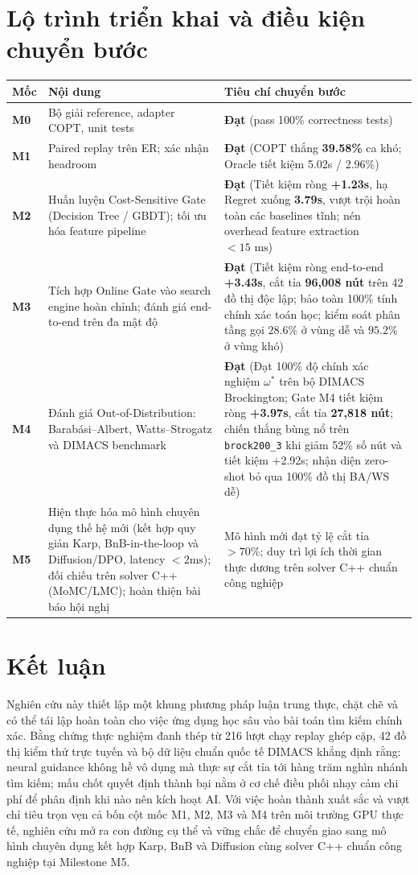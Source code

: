 \documentclass[11pt,a4paper]{article}
\begin{document}
\section{Lộ trình triển khai và điều kiện chuyển bước}
\begin{tabularx}{\linewidth}{lXX}
\toprule
Mốc & Nội dung & Tiêu chí chuyển bước\\
\midrule
\textbf{M0} & Bộ giải reference, adapter COPT, unit tests & \textbf{Đạt} (pass 100\% correctness tests)\\
\textbf{M1} & Paired replay trên ER; xác nhận headroom & \textbf{Đạt} (COPT thắng \textbf{39.58\%} ca khó; Oracle tiết kiệm 5.02s / 2.96\%)\\
\textbf{M2} & Huấn luyện Cost-Sensitive Gate (Decision Tree / GBDT); tối ưu hóa feature pipeline & \textbf{Đạt} (Tiết kiệm ròng \textbf{+1.23s}, hạ Regret xuống \textbf{3.79s}, vượt trội hoàn toàn các baselines tĩnh; nén overhead feature extraction $< 15\text{ ms}$)\\
\textbf{M3} & Tích hợp Online Gate vào search engine hoàn chỉnh; đánh giá end-to-end trên đa mật độ & \textbf{Đạt} (Tiết kiệm ròng end-to-end \textbf{+3.43s}, cắt tỉa \textbf{96,008 nút} trên 42 đồ thị độc lập; bảo toàn 100\% tính chính xác toán học; kiểm soát phân tầng gọi $28.6\%$ ở vùng dễ và $95.2\%$ ở vùng khó)\\
\textbf{M4} & Đánh giá Out-of-Distribution: Barab\'asi--Albert, Watts--Strogatz và DIMACS benchmark & \textbf{Đạt} (Đạt 100\% độ chính xác nghiệm $\omega^*$ trên bộ DIMACS Brockington; Gate M4 tiết kiệm ròng \textbf{+3.97s}, cắt tỉa \textbf{27,818 nút}; chiến thắng bùng nổ trên \texttt{brock200\_3} khi giảm 52\% số nút và tiết kiệm +2.92s; nhận diện zero-shot bỏ qua 100\% đồ thị BA/WS dễ)\\
\textbf{M5} & Hiện thực hóa mô hình chuyên dụng thế hệ mới (kết hợp quy giản Karp, BnB-in-the-loop và Diffusion/DPO, latency $<2\text{ms}$); đối chiếu trên solver C++ (MoMC/LMC); hoàn thiện bài báo hội nghị & Mô hình mới đạt tỷ lệ cắt tỉa $>70\%$; duy trì lợi ích thời gian thực dương trên solver C++ chuẩn công nghiệp\\
\bottomrule
\end{tabularx}

\section{Kết luận}
Nghiên cứu này thiết lập một khung phương pháp luận trung thực, chặt chẽ và có thể tái lập hoàn toàn cho việc ứng dụng học sâu vào bài toán tìm kiếm chính xác. Bằng chứng thực nghiệm đanh thép từ 216 lượt chạy replay ghép cặp, 42 đồ thị kiểm thử trực tuyến và bộ dữ liệu chuẩn quốc tế DIMACS khẳng định rằng: neural guidance không hề vô dụng mà thực sự cắt tỉa tới hàng trăm nghìn nhánh tìm kiếm; mấu chốt quyết định thành bại nằm ở cơ chế điều phối nhạy cảm chi phí để phân định khi nào nên kích hoạt AI. Với việc hoàn thành xuất sắc và vượt chỉ tiêu trọn vẹn cả bốn cột mốc M1, M2, M3 và M4 trên môi trường GPU thực tế, nghiên cứu mở ra con đường cụ thể và vững chắc để chuyển giao sang mô hình chuyên dụng kết hợp Karp, BnB và Diffusion cùng solver C++ chuẩn công nghiệp tại Milestone M5.



\end{document}
